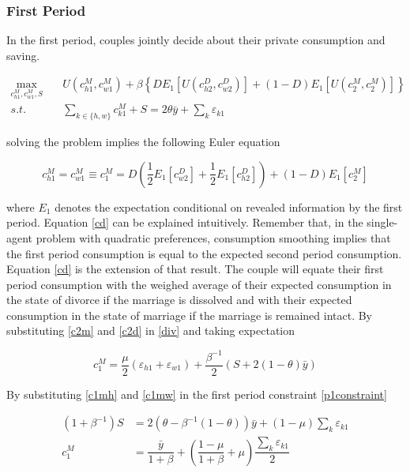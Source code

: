 \subsubsection{First Period}

In the first period, couples jointly decide about their private consumption and saving.  

\begin{align*}
\max_{c_{h1}^M, c_{w1}^M, S} \quad  &U(c_{h1}^M, c_{w1}^M) + \beta \left \{ D E_1[ U(c^D_{h2}, c^D_{w2})] + (1-D) E_1 [U(c_{2}^M, c_{2}^M)] \right \}  \\
s.t. &\sum_{k \in \{h,w\}} c^M_{k1} + S =  2 \theta  \bar y+ \sum_k \varepsilon_{k1}  \label{p1constraint}
\end{align*}


\noindent solving the problem implies the following Euler equation 


\begin{equation}
c^M_{h1} = c^M_{w1} \equiv c_1^M = D \left( \dfrac{1}{2}E_1[c^D_{w2}]  + \dfrac{1}{2}E_1 [c^D_{h2}] \right) + (1-D) E_1[c_2^M]  \label{cd}
\end{equation}

\noindent where $E_1$ denotes the expectation conditional on revealed information by the first period.  Equation \eqref{cd} can be explained intuitively. Remember that, in the single-agent problem with quadratic preferences, consumption smoothing implies that the first period consumption is equal to the expected second period consumption. Equation \eqref{cd} is the extension of that result. The couple will equate their first period consumption with the weighed average of their expected consumption in the state of divorce if the marriage is dissolved and with their expected consumption in the state of marriage if the marriage is remained intact. By substituting \eqref{c2m} and \eqref{c2d}  in \eqref {div} and taking expectation

\begin{equation}
c^M_{1} = \dfrac{ \mu}{2}   \left ( \varepsilon_{h1} + \varepsilon_{w1} \right )+ \dfrac{\beta^{-1}}{2} \left(  S + 2(1-\theta) \bar y\right)
\label{c1mh}
\end{equation}

\noindent By substituting \eqref{c1mh} and \eqref{c1mw} in the first period constraint \eqref{p1constraint}


\begin {align}
(1 + \beta^{-1}) S  &=  2 \left (\theta - \beta^{-1} (1- \theta)  \right ) \bar y + \left ( 1 - \mu \right ) \sum_k \varepsilon_{k1} \\
c^M_1 & = \dfrac{\bar y}{1+\beta} + \left( \dfrac{1-\mu}{1+\beta} + \mu \right) \dfrac{\sum \limits _{k} \varepsilon_{k1}}{2}
\label {saving}
\end{align}


